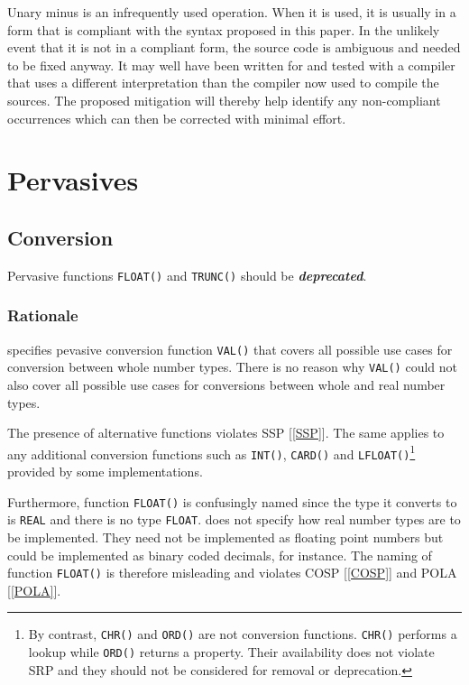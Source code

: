 \documentclass[10pt,a4paper]{article}
\renewcommand{\emph}[1]{\textbf{\textit{#1}}}
\begin{document}
Unary minus is an infrequently used operation. When it is used, it is usually
in a form that is compliant with the syntax proposed in this paper. In the
unlikely event that it is not in a compliant form, the source code is ambiguous
and needed to be fixed anyway. It may well have been written for and tested
with a compiler that uses a different interpretation than the compiler now
used to compile the sources. The proposed mitigation will thereby help
identify any non-compliant occurrences which can then be corrected with
minimal effort.


\section{Pervasives}

\subsection{Conversion}

Pervasive functions \verb|FLOAT()| and \verb|TRUNC()| should be
\emph{deprecated}.

\subsubsection{Rationale}

\cite{Wirth88} specifies pevasive conversion function \verb|VAL()| that covers
all possible use cases for conversion between whole number types. There is no
reason why \verb|VAL()| could not also cover all possible use cases for
conversions between whole and real number types.

The presence of alternative functions violates SSP [\ref{SSP}]. The same
applies to any additional conversion functions such as \verb|INT()|,
\verb|CARD()| and \verb|LFLOAT()|\footnote{By contrast, \texttt{CHR()} and
\texttt{ORD()} are not conversion functions. \texttt{CHR()} performs a
lookup while \texttt{ORD()} returns a property. Their availability
does not violate SRP and they should not be considered for removal
or deprecation.} provided by some implementations.
 
Furthermore, function \verb|FLOAT()| is confusingly named since the type it
converts to is \verb|REAL| and there is no type \verb|FLOAT|. \cite{Wirth88}
does not specify how real number types are to be implemented. They need not be
implemented as floating point numbers but could be implemented as binary coded
decimals, for instance. The naming of function \verb|FLOAT()| is therefore
misleading and violates COSP [\ref{COSP}] and POLA [\ref{POLA}].
\end{document}
